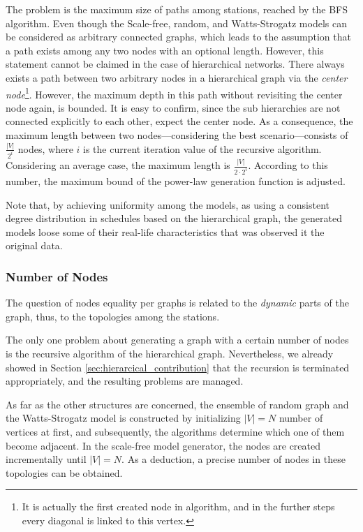 The problem is the maximum size of paths among stations, reached by the BFS algorithm. Even though the Scale-free, random, and Watts-Strogatz models can be considered as arbitrary connected graphs, which leads to the assumption that a path exists among any two nodes with an optional length. However, this statement cannot be claimed in the case of hierarchical networks. There always exists a path between two arbitrary nodes in a hierarchical graph via the \textit{center node}\footnote{It is actually the first created node in algorithm, and in the further steps every diagonal is linked to this vertex.}. However, the maximum depth in this path without revisiting the center node again, is bounded. It is easy to confirm, since the sub hierarchies are not connected explicitly to each other, expect the center node. As a consequence, the maximum length between two nodes---considering the best scenario---consists of $\frac{|V|}{2^i}$ nodes, where $i$ is the current iteration value of the recursive algorithm. Considering an average case, the maximum length is $\frac{|V|}{2 \cdot 2^i}$. According to this number, the maximum bound of the power-law generation function is adjusted.

Note that, by achieving uniformity among the models, as using a consistent degree distribution in schedules based on the hierarchical graph, the generated models loose some of their real-life characteristics that was observed it the original data.

\subsubsection{Number of Nodes}

The question of nodes equality per graphs is related to the \textit{dynamic} parts of the graph, thus, to the topologies among the stations.

The only one problem about generating a graph with a certain number of nodes is the recursive algorithm of the hierarchical graph. Nevertheless, we already showed in Section \ref{sec:hierarcical_contribution} that the recursion is terminated appropriately, and the resulting problems are managed.

As far as the other structures are concerned, the ensemble of random graph and the Watts-Strogatz model is constructed by initializing $|V| = N$ number of vertices at first, and subsequently, the algorithms determine which one of them become adjacent. In the scale-free model generator, the nodes are created incrementally until $|V| = N$. As a deduction, a precise number of nodes in these topologies can be obtained.

